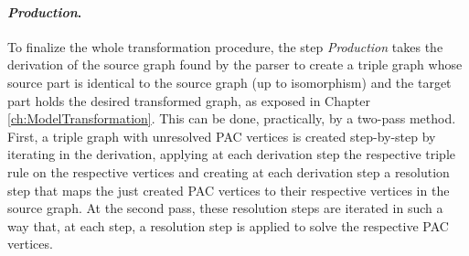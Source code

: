 \paragraph*{\textit{Production}.} To finalize the whole transformation procedure, the step \textit{Production} takes the derivation of the source graph found by the parser to create a triple graph whose source part is identical to the source graph (up to isomorphism) and the target part holds the desired transformed graph, as exposed in Chapter \ref{ch:ModelTransformation}. This can be done, practically, by a two-pass method. First, a triple graph with unresolved PAC vertices is created step-by-step by iterating in the derivation, applying at each derivation step the respective triple rule on the respective vertices and creating at each derivation step a resolution step that maps the just created PAC vertices to their respective vertices in the source graph. At the second pass, these resolution steps are iterated in such a way that, at each step, a resolution step is applied to solve the respective PAC vertices.

